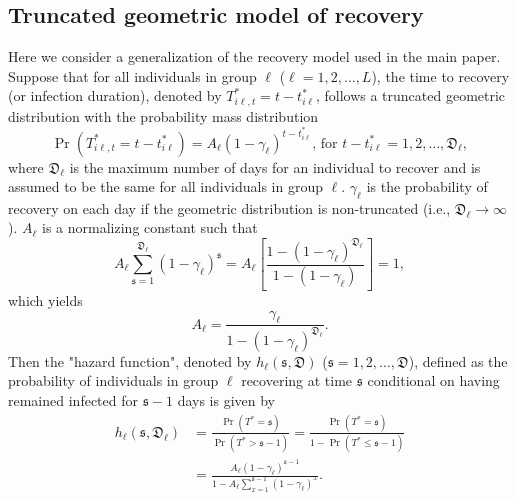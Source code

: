 \documentclass[12pt]{article}
\begin{document}
\subsection{Truncated geometric model of recovery\label{Sup: GeomTruncated}}

Here we consider a generalization of the recovery model used in the main
paper. Suppose that for all individuals in group $\ell$ ($\ell=1,2,\ldots,L$),
the time to recovery (or infection duration), denoted by $T_{i\ell,t}^{\ast
}=t-t_{i\ell}^{\ast}$, follows a truncated geometric distribution with the
probability mass distribution%
\begin{equation}
\Pr\left(  T_{i\ell,t}^{\ast}=t-t_{i\ell}^{\ast}\right)  =A_{\ell}\left(
1-\gamma_{\ell}\right)  ^{t-t_{i\ell}^{\ast}}\text{, for }t-t_{i\ell}^{\ast
}=1,2,\ldots,\mathfrak{D}_{\ell}, \label{TrunGeom}%
\end{equation}
where $\mathfrak{D}_{\ell}$ is the maximum number of days for an individual to
recover and is assumed to be the same for all individuals in group $\ell$.
$\gamma_{\ell}$ is the probability of recovery on each day if the geometric
distribution is non-truncated (i.e., $\mathfrak{D}_{\ell}\rightarrow\infty$).
$A_{\ell}$ is a normalizing constant such that%
\[
A_{\ell}\sum_{\mathfrak{s}=1}^{\mathfrak{D}_{\ell}}\left(  1-\gamma_{\ell
}\right)  ^{\mathfrak{s}}=A_{\ell}\left[  \frac{1-\left(  1-\gamma_{\ell
}\right)  ^{\mathfrak{D}_{\ell}}}{1-\left(  1-\gamma_{\ell}\right)  }\right]
=1,
\]
which yields%
\begin{equation}
A_{\ell}=\frac{\gamma_{\ell}}{1-\left(  1-\gamma_{\ell}\right)  ^{\mathfrak{D}%
_{\ell}}}. \label{Al}%
\end{equation}
Then the "hazard function", denoted by $h_{\ell}\left(  \mathfrak{s}%
,\mathfrak{D}\right)  $ ($\mathfrak{s}=1,2,\ldots,\mathfrak{D}$), defined as
the probability of individuals in group $\ell$ recovering at time
$\mathfrak{s}$ conditional on having remained infected for $\mathfrak{s}-1$
days is given by%
\begin{align*}
h_{\ell}\left(  \mathfrak{s},\mathfrak{D}_{\ell}\right)   &  =\frac{\Pr\left(
T^{\ast}=\mathfrak{s}\right)  }{\Pr\left(  T^{\ast}>\mathfrak{s}-1\right)
}=\frac{\Pr\left(  T^{\ast}=\mathfrak{s}\right)  }{1-\Pr\left(  T^{\ast}%
\leq\mathfrak{s}-1\right)  }\\
&  =\frac{A_{\ell}\left(  1-\gamma_{\ell}\right)  ^{\mathfrak{s}-1}}%
{1-A_{\ell}\sum_{x=1}^{\mathfrak{s}-1}\left(  1-\gamma_{\ell}\right)  ^{x}}.
\end{align*}
\end{document}
